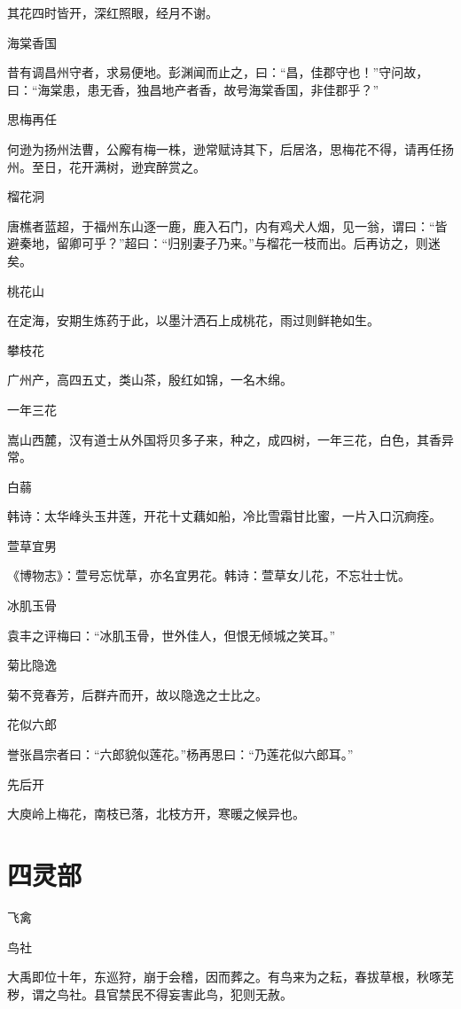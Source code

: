 \documentclass[a4paper,12pt,UTF8,twoside]{ctexbook}
\begin{document}
    其花四时皆开，深红照眼，经月不谢。
    
    海棠香国
    
    昔有调昌州守者，求易便地。彭渊闻而止之，曰：“昌，佳郡守也！”守问故，曰：“海棠患，患无香，独昌地产者香，故号海棠香国，非佳郡乎？”
    
    思梅再任
    
    何逊为扬州法曹，公廨有梅一株，逊常赋诗其下，后居洛，思梅花不得，请再任扬州。至日，花开满树，逊宾醉赏之。
    
    榴花洞
    
    唐樵者蓝超，于福州东山逐一鹿，鹿入石门，内有鸡犬人烟，见一翁，谓曰：“皆避秦地，留卿可乎？”超曰：“归别妻子乃来。”与榴花一枝而出。后再访之，则迷矣。
    
    桃花山
    
    在定海，安期生炼药于此，以墨汁洒石上成桃花，雨过则鲜艳如生。
    
    攀枝花
    
    广州产，高四五丈，类山茶，殷红如锦，一名木绵。
    
    一年三花
    
    嵩山西麓，汉有道士从外国将贝多子来，种之，成四树，一年三花，白色，其香异常。
    
    白蒻
    
    韩诗：太华峰头玉井莲，开花十丈藕如船，冷比雪霜甘比蜜，一片入口沉痾痊。
    
    萱草宜男
    
    《博物志》：萱号忘忧草，亦名宜男花。韩诗：萱草女儿花，不忘壮士忧。
    
    冰肌玉骨
    
    袁丰之评梅曰：“冰肌玉骨，世外佳人，但恨无倾城之笑耳。”
    
    菊比隐逸
    
    菊不竞春芳，后群卉而开，故以隐逸之士比之。
    
    花似六郎
    
    誉张昌宗者曰：“六郎貌似莲花。”杨再思曰：“乃莲花似六郎耳。”
    
    先后开
    
    大庾岭上梅花，南枝已落，北枝方开，寒暖之候异也。
    
    \part{四灵部}
    
    飞禽
    
    鸟社
    
    大禹即位十年，东巡狩，崩于会稽，因而葬之。有鸟来为之耘，春拔草根，秋啄芜秽，谓之鸟社。县官禁民不得妄害此鸟，犯则无赦。
    
\end{document}
